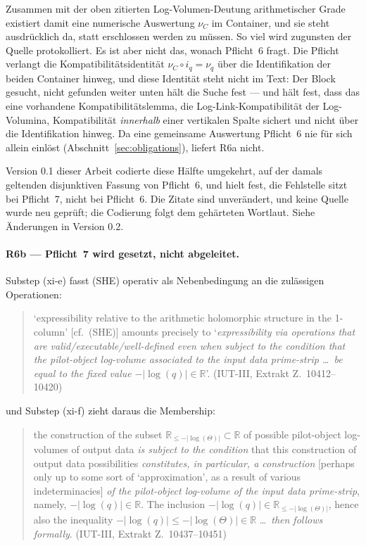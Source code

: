 \documentclass[11pt,a4paper]{article}
\theoremstyle{definition}
\newcommand{\anchor}[2]{(#1, Extrakt Z.~#2)}
\begin{document}
Zusammen mit der oben zitierten Log-Volumen-Deutung arithmetischer Grade existiert
damit eine numerische Auswertung $\nu_C$ im Container, und sie steht ausdrücklich
da, statt erschlossen werden zu müssen. So viel wird zugunsten der Quelle
protokolliert. Es ist aber nicht das, wonach Pflicht~6 fragt. Die Pflicht verlangt
die Kompatibilitätsidentität $\nu_C \circ i_q = \nu_q$ über die Identifikation der
beiden Container hinweg, und diese Identität steht nicht im Text: Der Block
\glqq gesucht, nicht gefunden\grqq{} weiter unten hält die Suche fest --- und hält fest, dass
das eine vorhandene Kompatibilitätslemma, die Log-Link-Kompatibilität der
Log-Volumina, Kompatibilität \emph{innerhalb} einer vertikalen Spalte sichert und
nicht über die Identifikation hinweg. Da eine gemeinsame Auswertung Pflicht~6 nie
für sich allein einlöst (Abschnitt~\ref{sec:obligations}), liefert R6a nicht.

\medskip\noindent
Version 0.1 dieser Arbeit codierte diese Hälfte umgekehrt, auf der damals
geltenden disjunktiven Fassung von Pflicht~6, und hielt fest, \glqq die Fehlstelle
sitzt bei Pflicht~7, nicht bei Pflicht~6\grqq. Die Zitate sind unverändert, und keine
Quelle wurde neu geprüft; die Codierung folgt dem gehärteten Wortlaut. Siehe
\glqq Änderungen in Version 0.2\grqq.

\paragraph{R6b --- Pflicht~7 wird gesetzt, nicht abgeleitet.} Substep (xi-e) fasst (SHE)
operativ als Nebenbedingung an die zulässigen Operationen:

\begin{quote}\small
\glqq `expressibility relative to the arithmetic holomorphic structure in the
1-column' [cf.\ (SHE)] amounts precisely to `\emph{expressibility via operations
that are valid/executable/well-defined even when subject to the condition that
the pilot-object log-volume associated to the input data prime-strip \dots\ be
equal to the fixed value} $-|\log(q)| \in \mathbb{R}$'.\grqq
\hfill\anchor{IUT-III}{10412--10420}
\end{quote}

und Substep (xi-f) zieht daraus die Membership:

\begin{quote}\small
\glqq the construction of the subset $\mathbb{R}_{\le -|\log(\Theta)|} \subset
\mathbb{R}$ of possible pilot-object log-volumes of output data \emph{is subject
to the condition} that this construction of output data possibilities
\emph{constitutes, in particular, a construction} [perhaps only up to some sort of
`approximation', as a result of various indeterminacies] \emph{of the
pilot-object log-volume of the input data prime-strip}, namely,
$-|\log(q)| \in \mathbb{R}$. The inclusion
$-|\log(q)| \in \mathbb{R}_{\le -|\log(\Theta)|}$, hence also the inequality
$-|\log(q)| \le -|\log(\Theta)| \in \mathbb{R}$ \dots\ \emph{then follows
formally}.\grqq{} \hfill\anchor{IUT-III}{10437--10451}
\end{quote}
\end{document}
